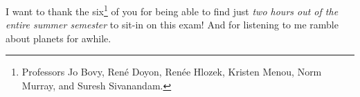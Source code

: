 I want to thank the six\footnote{Professors 
Jo Bovy, Ren\'{e} Doyon, Ren\'{e}e Hlozek, Kristen Menou, Norm Murray, and 
Suresh Sivanandam.}
of you for being able to find just \emph{two hours out of
the entire summer semester} to sit-in on this exam! And for listening
to me ramble about planets for awhile.
